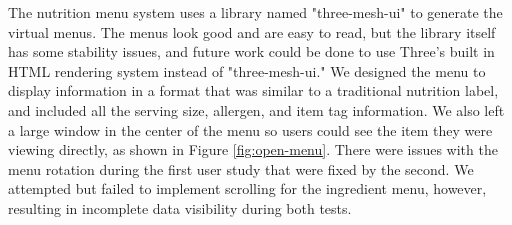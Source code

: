 \documentclass[thesis]{fputhesis}
\begin{document}
\begin{body}
The nutrition menu system uses a library named "three-mesh-ui" to generate the virtual menus. The menus look good and are easy to read, but the library itself has some stability issues, and future work could be done to use Three's built in HTML rendering system instead of "three-mesh-ui." 
We designed the menu to display information in a format that was similar to a traditional nutrition label, and included all the serving size, allergen, and item tag information. We also left a large window in the center of the menu so users could see the item they were viewing directly, as shown in Figure \ref{fig:open-menu}. There were issues with the menu rotation during the first user study that were fixed by the second. We attempted but failed to implement scrolling for the ingredient menu, however, resulting in incomplete data visibility during both tests. %

\end{body}
\end{document}

